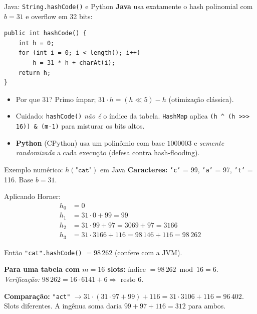 \documentclass[aspectratio=169]{beamer}
\begin{document}
\begin{frame}[fragile]{Java: \texttt{String.hashCode()} e Python}
\textbf{Java} usa exatamente o hash polinomial com $b = 31$ e overflow em 32 bits:
\begin{verbatim}
public int hashCode() {
    int h = 0;
    for (int i = 0; i < length(); i++)
        h = 31 * h + charAt(i);
    return h;
}
\end{verbatim}
\begin{itemize}
\item Por que $31$? Primo ímpar; $31 \cdot h = (h \ll 5) - h$ (otimização clássica).
\item \alert{Cuidado:} \texttt{hashCode()} \emph{não é} o índice da tabela. \texttt{HashMap} aplica \texttt{(h \^{} (h >>> 16)) \& (m-1)} para misturar os bits altos.
\item \textbf{Python} (CPython) usa um polinômio com base $1000003$ e \emph{semente randomizada} a cada execução (defesa contra hash-flooding).
\end{itemize}
\end{frame}

\begin{frame}[fragile,shrink=10]{Exemplo numérico: $h(\texttt{"cat"})$ em Java}
\textbf{Caracteres:} \texttt{'c'} = 99, \texttt{'a'} = 97, \texttt{'t'} = 116. Base $b = 31$.

\smallskip
Aplicando Horner:
\begin{align*}
h_0 &= 0 \\
h_1 &= 31 \cdot 0 + 99 = 99 \\
h_2 &= 31 \cdot 99 + 97 = 3069 + 97 = 3166 \\
h_3 &= 31 \cdot 3166 + 116 = 98\,146 + 116 = 98\,262
\end{align*}

\medskip
Então \texttt{"cat".hashCode()} $= 98\,262$ (confere com a JVM).

\medskip
\textbf{Para uma tabela com $m = 16$ slots:} índice $= 98\,262 \bmod 16 = 6$.\\
{\footnotesize\textit{Verificação:} $98\,262 = 16 \cdot 6141 + 6 \Rightarrow$ resto $6$.}

\medskip
\textbf{Comparação:} \texttt{"act"} $\to 31\cdot(31\cdot 97 + 99) + 116 = 31\cdot 3106 + 116 = 96\,402$.\\
Slots diferentes. A ingênua soma daria $99 + 97 + 116 = 312$ para ambos.
\end{frame}
\end{document}
